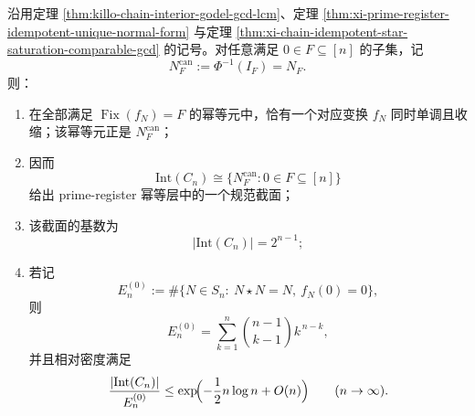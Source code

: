 \begin{theorem}\label{thm:xi-prime-register-canonical-fixedzero-section-sparsity}
沿用定理 \ref{thm:killo-chain-interior-godel-gcd-lcm}、定理 \ref{thm:xi-prime-register-idempotent-unique-normal-form} 与定理 \ref{thm:xi-chain-idempotent-star-saturation-comparable-gcd} 的记号。对任意满足 \(0\in F\subseteq[n]\) 的子集，记
\[
N_F^{\mathrm{can}}:=\Phi^{-1}(I_F)=N_F.
\]
则：
\begin{enumerate}
  \item 在全部满足 \(\operatorname{Fix}(f_N)=F\) 的幂等元中，恰有一个对应变换 \(f_N\) 同时单调且收缩；该幂等元正是 \(N_F^{\mathrm{can}}\)；
  \item 因而
  \[
  \mathrm{Int}(C_n)\cong \{N_F^{\mathrm{can}}:0\in F\subseteq[n]\}
  \]
  给出 prime-register 幂等层中的一个规范截面；
  \item 该截面的基数为
  \[
  |\mathrm{Int}(C_n)|=2^{n-1};
  \]
  \item 若记
  \[
  E_n^{(0)}
  :=
  \#\{N\in S_n:\ N\star N=N,\ f_N(0)=0\},
  \]
  则
  \[
  E_n^{(0)}
  =
  \sum_{k=1}^{n}\binom{n-1}{k-1}k^{\,n-k},
  \]
  并且相对密度满足
  \[
  \frac{|\mathrm{Int}(C_n)|}{E_n^{(0)}}
  \le
  \exp\!\Bigl(-\frac12 n\log n+O(n)\Bigr)
  \qquad (n\to\infty).
  \]
\end{enumerate}
\end{theorem}
